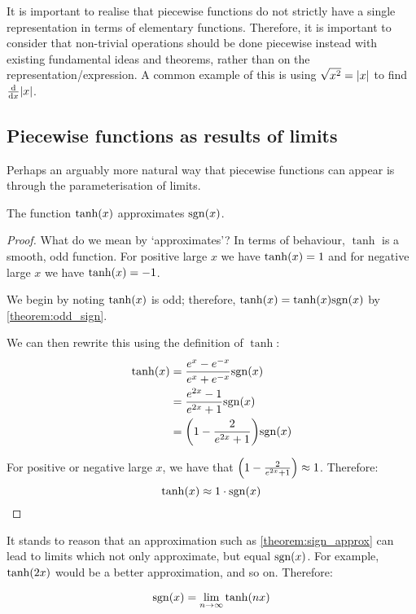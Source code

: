 It is important to realise that piecewise functions do not strictly have a single representation in terms of elementary functions. Therefore, it is important to consider that non-trivial operations should be done piecewise instead with existing fundamental ideas and theorems, rather than on the representation/expression. A common example of this is using $\sqrt{x^2}=\abs{x}$ to find $\dv{}{x}{\abs{x}}$.

\subsection{Piecewise functions as results of limits}
Perhaps an arguably more natural way that piecewise functions can appear is through the parameterisation of limits.

\begin{theorem}
    \label{theorem:sign_approx}
    The function $\tanh\paren{x}$ approximates $\sgn{x}$.

    \begin{proof}
        What do we mean by `approximates'? In terms of behaviour, $\tanh$ is a smooth, odd function. For positive large $x$ we have $\tanh\paren{x}=1$ and for negative large $x$ we have $\tanh\paren{x}=-1$.

        We begin by noting $\tanh\paren{x}$ is odd; therefore, $\tanh\paren{x}=\tanh\paren{x}\sgn{x}$ by \ref{theorem:odd_sign}.

        We can then rewrite this using the definition of $\tanh$:
        \begin{align*}
            \tanh\paren{x} &= \frac{e^x-e^{-x}}{e^x+e^{-x}}\sgn{x} \\
                           &= \frac{e^{2x}-1}{e^{2x}+1}\sgn{x} \\
                           &= \paren*{1-\frac{2}{e^{2x}+1}}\sgn{x}
        \end{align*}

        For positive or negative large $x$, we have that $\paren*{1-\frac{2}{e^{2x}+1}}\approx 1$. Therefore:
        $$
            \tanh\paren{x} \approx 1\cdot\sgn{x}
        $$
    \end{proof}
\end{theorem}

\begin{theorem}
    It stands to reason that an approximation such as \ref{theorem:sign_approx} can lead to limits which not only approximate, but equal $\sgn{x}$. For example, $\tanh\paren{2x}$ would be a better approximation, and so on. Therefore:

    $$
        \sgn{x}=\lim_{n\to\infty}{\tanh\paren{nx}}
    $$
\end{theorem}

